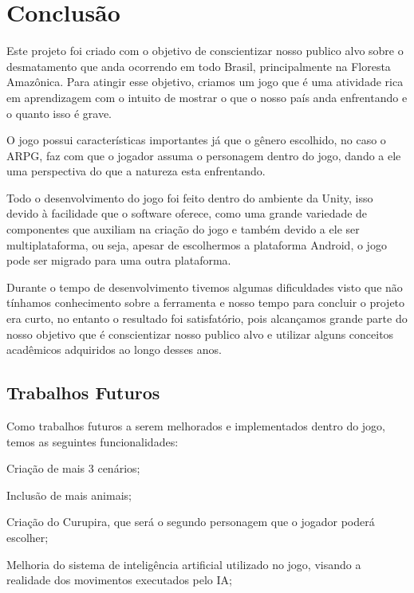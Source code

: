\chapter{Conclusão}
\label{chap:conclusoes-e-trabalhos-futuros}

Este projeto foi criado com o objetivo de conscientizar nosso publico alvo sobre o desmatamento que anda ocorrendo em todo Brasil, principalmente na Floresta Amazônica. Para atingir esse objetivo, criamos um jogo que é uma atividade rica em aprendizagem com o intuito de mostrar o que o nosso país anda enfrentando e o quanto isso é grave.

O jogo possui características importantes já que o gênero escolhido, no caso o ARPG, faz com que o jogador assuma o personagem dentro do jogo, dando a ele uma perspectiva do que a natureza esta enfrentando.

Todo o desenvolvimento do jogo foi feito dentro do ambiente da Unity, isso devido à facilidade que o software oferece, como uma grande variedade de componentes que auxiliam na criação do jogo e também devido a ele ser multiplataforma, ou seja, apesar de escolhermos a plataforma Android, o jogo pode ser migrado para uma outra plataforma.

Durante o tempo de desenvolvimento tivemos algumas dificuldades visto que não tínhamos conhecimento sobre a ferramenta e nosso tempo para concluir o projeto era curto, no entanto o resultado foi satisfatório, pois alcançamos grande parte do nosso objetivo que é conscientizar nosso publico alvo e utilizar alguns conceitos acadêmicos adquiridos ao longo desses anos.

\section{Trabalhos Futuros}
\label{sec:trabalhos-futuros}

Como trabalhos futuros a serem melhorados e implementados dentro do jogo, temos as seguintes funcionalidades:

\begin{alineascomponto}
	
   \item Criação de mais 3 cenários;
   \item Inclusão de mais animais;
   \item Criação do Curupira, que será o segundo personagem que o jogador poderá escolher;
   \item Melhoria do sistema de inteligência artificial utilizado no jogo, visando a realidade dos movimentos executados pelo IA;

	\end{alineascomponto}